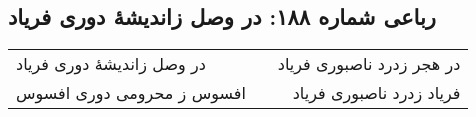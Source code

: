 \begin{center}
\section*{رباعی شماره ۱۸۸: در وصل زاندیشهٔ دوری فریاد}
\label{sec:sh188}
\begin{longtable}{l p{0.5cm} r}
در وصل زاندیشهٔ دوری فریاد
&&
در هجر زدرد ناصبوری فریاد
\\
افسوس ز محرومی دوری افسوس
&&
فریاد زدرد ناصبوری فریاد
\\
\end{longtable}
\end{center}
